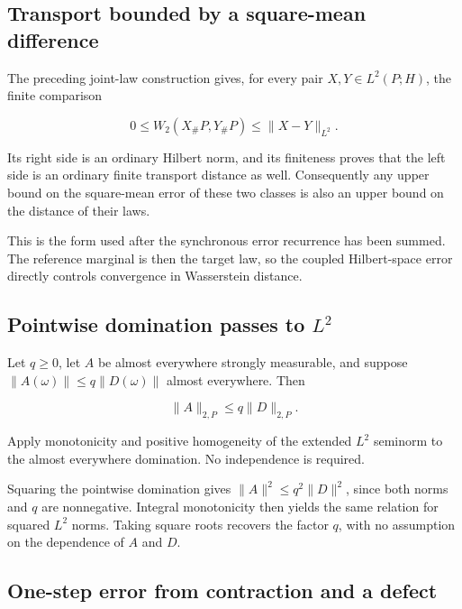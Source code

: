 \documentclass[11pt,a4paper]{report}
\begin{document}
\subsection{\texorpdfstring{Transport bounded by a square-mean difference}{Transport bounded by a square-mean difference}}
\label{report-step-UnadjustedLangevin-Coupling-lean-13}


The preceding joint-law construction gives, for every pair \(X,Y\in L^2(P;H)\), the finite comparison

\[0\le W_2(X_\#P,Y_\#P)\le\|X-Y\|_{L^2}.\]


Its right side is an ordinary Hilbert norm, and its finiteness proves that the left side is an ordinary finite transport distance as well. Consequently any upper bound on the square-mean error of these two classes is also an upper bound on the distance of their laws.



This is the form used after the synchronous error recurrence has been summed. The reference marginal is then the target law, so the coupled Hilbert-space error directly controls convergence in Wasserstein distance.

\subsection{\texorpdfstring{Pointwise domination passes to \(L^2\)}{Pointwise domination passes to L²}}
\label{report-step-UnadjustedLangevin-Coupling-lean-14}


Let \(q\ge0\), let \(A\) be almost everywhere strongly measurable, and suppose \(\|A(\omega)\|\le q\|D(\omega)\|\) almost everywhere. Then

\[\|A\|_{2,P}\le q\|D\|_{2,P}.\]

Apply monotonicity and positive homogeneity of the extended \(L^2\) seminorm to the almost everywhere domination. No independence is required.



Squaring the pointwise domination gives \(\|A\|^2\le q^2\|D\|^2\), since both norms and \(q\) are nonnegative. Integral monotonicity then yields the same relation for squared \(L^2\) norms. Taking square roots recovers the factor \(q\), with no assumption on the dependence of \(A\) and \(D\).

\subsection{\texorpdfstring{One-step error from contraction and a defect}{One-step error from contraction and a defect}}
\label{report-step-UnadjustedLangevin-Coupling-lean-15}
\end{document}
